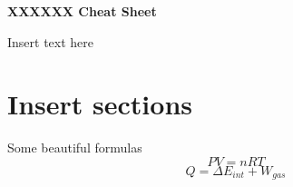 \documentclass[a4paper,landscape]{article}
\author{Daniel Pettersson}
\begin{document}
\begin{multicols*}{4}
\begin{center}
	\Large{\textbf{XXXXXX Cheat Sheet}} \\
\end{center}

Insert text here

\section{Insert sections}

Some beautiful formulas
\[ PV = nRT \]
\[ Q = \Delta E_{int} + W_{gas} \]



\end{multicols*}
\end{document}
